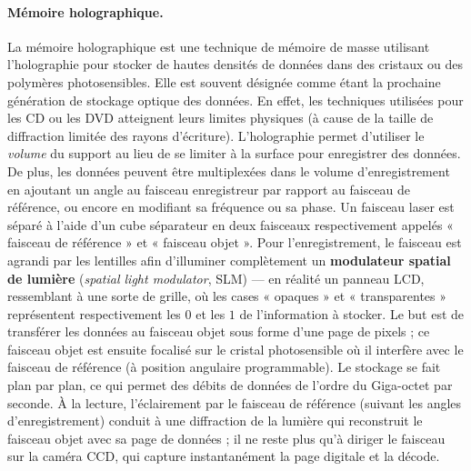 \paragraph{Mémoire holographique.}
La mémoire holographique est une technique de mémoire de masse utilisant
l'holographie pour stocker de hautes densités de données dans des cristaux ou
des polymères photosensibles. Elle est souvent désignée comme étant la prochaine
génération de stockage optique des données. En effet, les techniques utilisées
pour les CD ou les DVD atteignent leurs limites physiques (à cause de la taille
de diffraction limitée des rayons d'écriture). L'holographie permet d'utiliser
le \emph{volume} du support au lieu de se limiter à la surface pour enregistrer
des données. De plus, les données peuvent être multiplexées dans le volume
d'enregistrement en ajoutant un angle au faisceau enregistreur par rapport au
faisceau de référence, ou encore en modifiant sa fréquence ou sa phase. Un
faisceau laser est séparé à l'aide d'un cube séparateur en deux faisceaux
respectivement appelés « faisceau de référence » et « faisceau objet ». Pour
l'enregistrement, le faisceau est agrandi par les lentilles afin d'illuminer
complètement un \textbf{modulateur spatial de lumière} (\textit{spatial light
modulator}, SLM) --- en réalité un panneau LCD, ressemblant à une sorte de
grille, où les cases « opaques » et « transparentes » représentent
respectivement les $0$ et les $1$ de l'information à stocker. Le but est de
transférer les données au faisceau objet sous forme d'une page de pixels ; ce
faisceau objet est ensuite focalisé sur le cristal photosensible où il interfère
avec le faisceau de référence (à position angulaire programmable). Le stockage
se fait plan par plan, ce qui permet des débits de données de l'ordre du
Giga-octet par seconde. À la lecture, l'éclairement par le faisceau de référence
(suivant les angles d'enregistrement) conduit à une diffraction de la lumière qui
reconstruit le faisceau objet avec sa page de données ; il ne reste plus qu'à
diriger le faisceau sur la caméra CCD, qui capture instantanément la page
digitale et la décode.


